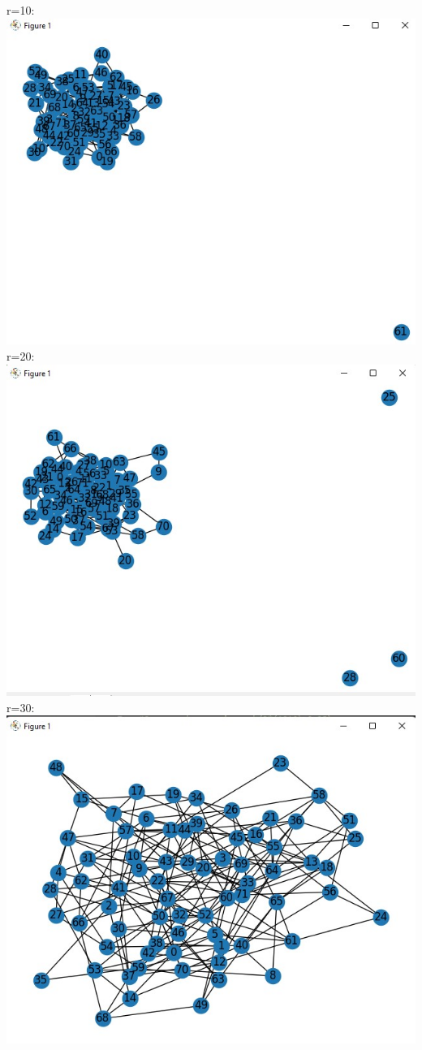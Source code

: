 \documentclass[answers]{exam}
\begin{document}
\begin{questions}
\begin{framed}
r=10:\\\includegraphics[width=10 cm]{3rd conf 10.jpg}\\
r=20:\\\includegraphics[width=10 cm]{3rd conf 20.jpg}\\
r=30:\\\includegraphics[width=10 cm]{3rd conf 30.jpg}\\


\end{framed}
\end{questions}
\end{document}
